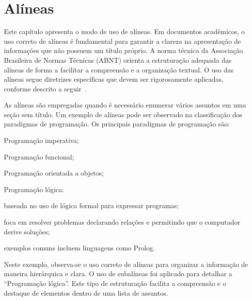 
\chapter{Alíneas}
\label{cap:alineas}

Este capítulo apresenta o modo de uso de alíneas. Em documentos acadêmicos, o uso correto de alíneas é fundamental para garantir a clareza na apresentação de informações que não possuem um título próprio. A norma técnica da Associação Brasileira de Normas Técnicas (ABNT) orienta a estruturação adequada das alíneas de forma a facilitar a compreensão e a organização textual. O uso das alíneas segue diretrizes específicas que devem ser rigorosamente aplicadas, conforme descrito a seguir~\cite{abnt2012}.

As alíneas são empregadas quando é necessário enumerar vários assuntos em uma seção sem título. Um exemplo de alíneas pode ser observado na classificação dos paradigmas de programação. Os principais paradigmas de programação são:

\begin{alineas}
    \item Programação imperativa;
    \item Programação funcional;
    \item Programação orientada a objetos;
    \item Programação lógica:
        \begin{subalineas}
            \item baseada no uso de lógica formal para expressar programas;
            \item foca em resolver problemas declarando relações e permitindo que o computador derive soluções;
            \item exemplos comuns incluem linguagens como Prolog.
        \end{subalineas}
\end{alineas}

Neste exemplo, observa-se o uso correto de alíneas para organizar a informação de maneira hierárquica e clara. O uso de subalíneas foi aplicado para detalhar a ``Programação lógica''. Este tipo de estruturação facilita a compreensão e o destaque de elementos dentro de uma lista de assuntos.
